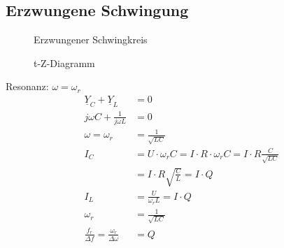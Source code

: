 \newpage
\subsection{Erzwungene Schwingung}

\begin{figure}[!h]
\centering
{}
\qquad
{}
\caption{Erzwungener Schwingkreis}
\label{fig:schwingkreise:erzwungene}
\end{figure}

% 	
% 	

\begin{wrapfigure}{l}{0.5\textwidth}
	\centering
	
	\caption{t-Z-Diagramm}
	\label{fig:tZDiagramm}
\end{wrapfigure}



Resonanz: $\omega = \omega_r$\\
\begin{align}
	\underline{Y}_C +\underline{Y}_L &= 0\nonumber\\
	j\omega C+\frac{1}{j\omega L} &= 0\nonumber\\
	\omega=\omega_r&=\frac{1}{\sqrt{LC}}\nonumber\\
	I_C&=U\cdot\omega_rC=I\cdot R \cdot \omega_rC=I\cdot R
	\frac{C}{\sqrt{LC}}\nonumber\\
	&=I\cdot R \sqrt{\frac{C}{L}} = I \cdot Q\nonumber\\
	I_L&=\frac{U}{\omega_rL}=I \cdot Q\nonumber\\
	\omega_r&=\frac{1}{\sqrt{LC}}\nonumber\\
	\frac{f_r}{\Delta f}=\frac{\omega_r}{\Delta \omega} &= Q\nonumber
\end{align}\\


